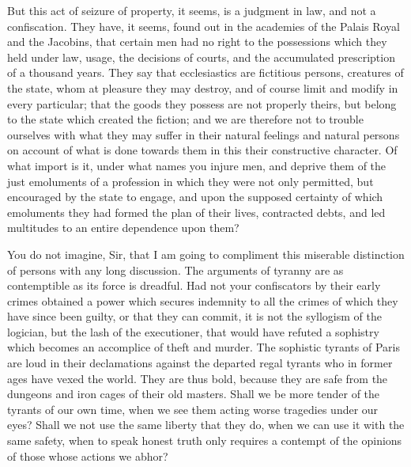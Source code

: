 But this act of seizure of property, it seems, is a judgment in law, and not a confiscation. They have, it seems, found out in the academies of the Palais Royal and the Jacobins, that certain men had no right to the possessions which they held under law, usage, the decisions of courts, and the accumulated prescription of a thousand years. They say that ecclesiastics are fictitious persons, creatures of the state, whom at pleasure they may destroy, and of course limit and modify in every particular; that the goods they possess are not properly theirs, but belong to the state which created the fiction; and we are therefore not to trouble ourselves with what they may suffer in their natural feelings and natural persons on account of what is done towards them in this their constructive character. Of what import is it, under what names you injure men, and deprive them of the just emoluments of a profession in which they were not only permitted, but encouraged by the state to engage, and upon the supposed certainty of which emoluments they had formed the plan of their lives, contracted debts, and led multitudes to an entire dependence upon them?

You do not imagine, Sir, that I am going to compliment this miserable distinction of persons with any long discussion. The arguments of tyranny are as contemptible as its force is dreadful. Had not your confiscators by their early crimes obtained a power which secures indemnity to all the crimes of which they have since been guilty, or that they can commit, it is not the syllogism of the logician, but the lash of the executioner, that would have refuted a sophistry which becomes an accomplice of theft and murder. The sophistic tyrants of Paris are loud in their declamations against the departed regal tyrants who in former ages have vexed the world. They are thus bold, because they are safe from the dungeons and iron cages of their old masters. Shall we be more tender of the tyrants of our own time, when we see them acting worse tragedies under our eyes? Shall we not use the same liberty that they do, when we can use it with the same safety, when to speak honest truth only requires a contempt of the opinions of those whose actions we abhor?

